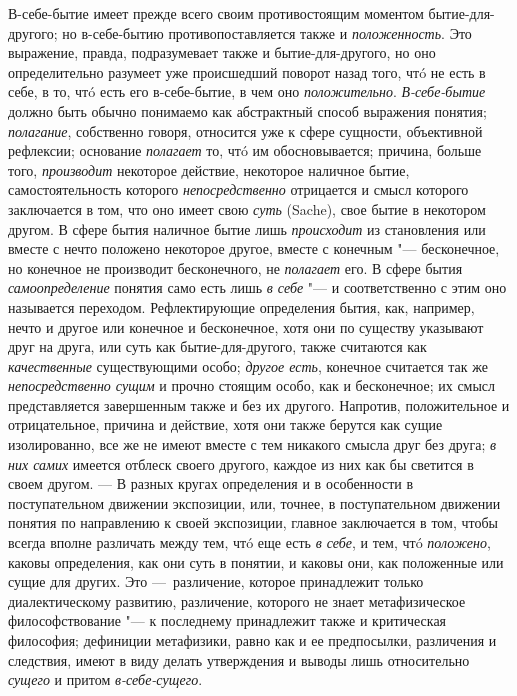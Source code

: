 В-себе-бытие имеет прежде всего своим противостоящим моментом
бытие-для-другого; но в-себе-бытию противопоставляется также и
{\em положенность}. Это выражение, правда,
подразумевает также и бытие-для-другого, но оно определительно разумеет уже
происшедший поворот назад того, чтó не есть в себе, в то, чтó есть его
в-себе-бытие, в чем оно {\em положительно}.
{\em В-себе-бытие} должно быть обычно понимаемо как
абстрактный способ выражения понятия; {\em полагание},
собственно говоря, относится уже к сфере сущности, объективной рефлексии;
основание {\em полагает} то, чтó им обосновывается;
причина, больше того, {\em производит} некоторое
действие, некоторое наличное бытие, самостоятельность которого
{\em непосредственно} отрицается и смысл которого
заключается в том, что оно имеет свою {\em суть}
(Sache), свое бытие в некотором другом. В сфере бытия наличное бытие лишь
{\em происходит} из становления или вместе с нечто
положено некоторое другое, вместе с конечным "--- бесконечное, но конечное не
производит бесконечного, не {\em полагает} его. В сфере
бытия {\em самоопределение} понятия само есть лишь
{\em в себе} "--- и соответственно с этим оно называется
переходом. Рефлектирующие определения бытия, как, например, нечто и другое
или конечное и бесконечное, хотя они по существу указывают друг на друга,
или суть как бытие-для-другого, также считаются как
{\em качественные} существующими особо;
{\em другое есть}, конечное считается так же
{\em непосредственно сущим} и прочно стоящим особо, как
и бесконечное; их смысл представляется завершенным также и без их другого.
Напротив, положительное и отрицательное, причина и действие, хотя они также
берутся как сущие изолированно, все же не имеют вместе с тем никакого
смысла друг без друга; {\em в них самих} имеется
отблеск своего другого, каждое из них как бы светится в своем другом. — В
разных кругах определения и в особенности в поступательном движении
экспозиции, или, точнее, в поступательном движении понятия по направлению к
своей экспозиции, главное заключается в том, чтобы всегда вполне различать
между тем, чтó еще есть {\em в себе}, и тем, чтó
{\em положено}, каковы определения, как они суть в
понятии, и каковы они, как положенные или сущие для других. Это
—~различение, которое принадлежит только диалектическому развитию,
различение, которого не знает метафизическое философствование "--- к
последнему принадлежит также и критическая философия; дефиниции метафизики,
равно как и ее предпосылки, различения и следствия, имеют в виду делать
утверждения и выводы лишь относительно {\em сущего} и
притом {\em в-себе-сущего}.


